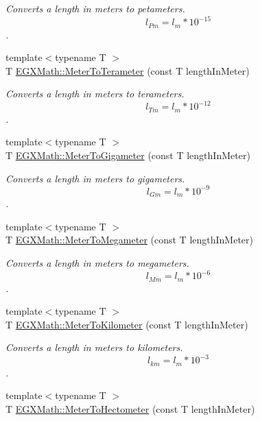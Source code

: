 \begin{DoxyCompactItemize}
\begin{DoxyCompactList}\small\item\em Converts a length in meters to petameters. \[ l_{Pm}=l_{m} * 10^{-15} \]. \end{DoxyCompactList}\item 
{\footnotesize template$<$typename T $>$ }\\T \mbox{\hyperlink{group___e_g_x_math-_conversions-_length_conversions-_meter-_s_i_gac4c21d00b7d8e8fc1c9e354f77bf94b2}{E\+G\+X\+Math\+::\+Meter\+To\+Terameter}} (const T length\+In\+Meter)
\begin{DoxyCompactList}\small\item\em Converts a length in meters to terameters. \[ l_{Tm}=l_{m} * 10^{-12} \]. \end{DoxyCompactList}\item 
{\footnotesize template$<$typename T $>$ }\\T \mbox{\hyperlink{group___e_g_x_math-_conversions-_length_conversions-_meter-_s_i_ga045300d4eccd668680eab86f9262cc81}{E\+G\+X\+Math\+::\+Meter\+To\+Gigameter}} (const T length\+In\+Meter)
\begin{DoxyCompactList}\small\item\em Converts a length in meters to gigameters. \[ l_{Gm}=l_{m} * 10^{-9} \]. \end{DoxyCompactList}\item 
{\footnotesize template$<$typename T $>$ }\\T \mbox{\hyperlink{group___e_g_x_math-_conversions-_length_conversions-_meter-_s_i_ga738fd2590049b1c2ae6ef2ecad9ed7f9}{E\+G\+X\+Math\+::\+Meter\+To\+Megameter}} (const T length\+In\+Meter)
\begin{DoxyCompactList}\small\item\em Converts a length in meters to megameters. \[ l_{Mm}=l_{m} * 10^{-6} \]. \end{DoxyCompactList}\item 
{\footnotesize template$<$typename T $>$ }\\T \mbox{\hyperlink{group___e_g_x_math-_conversions-_length_conversions-_meter-_s_i_ga31b34ce8172d5b2401deb27db4ed6ece}{E\+G\+X\+Math\+::\+Meter\+To\+Kilometer}} (const T length\+In\+Meter)
\begin{DoxyCompactList}\small\item\em Converts a length in meters to kilometers. \[ l_{km}=l_{m} * 10^{-3} \]. \end{DoxyCompactList}\item 
{\footnotesize template$<$typename T $>$ }\\T \mbox{\hyperlink{group___e_g_x_math-_conversions-_length_conversions-_meter-_s_i_ga1de9cc8f2ecedbf82eacc869b0c0569c}{E\+G\+X\+Math\+::\+Meter\+To\+Hectometer}} (const T length\+In\+Meter)

\end{DoxyCompactItemize}
